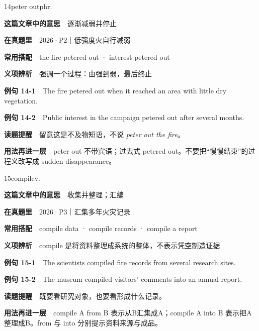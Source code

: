 \documentclass[a4paper,11pt,openany]{report}
\newcommand{\emphasislabel}[1]{\textcolor{leaf}{\CJKsf\bfseries #1}}
\begin{document}
\begin{vocabbox}{14}{peter out}{phr.}

\textbf{这篇文章中的意思}　逐渐减弱并停止

\textbf{在真题里}　2026·P2｜低强度火自行减弱

\textbf{常用搭配}　the fire petered out · interest petered out

\textbf{义项辨析}　强调一个过程：由强到弱，最后终止

\textbf{例句 14-1}　The fire petered out when it reached an area with little dry vegetation.

\textbf{例句 14-2}　Public interest in the campaign petered out after several months.

\emphasislabel{读题提醒}　留意这是不及物短语，不说 \emph{peter out the fire}。

\textbf{用法再进一层}　peter out 不带宾语；过去式 petered out。不要把``慢慢结束''的过程义改写成 sudden disappearance。

\end{vocabbox}

\begin{vocabbox}{15}{compile}{v.}

\textbf{这篇文章中的意思}　收集并整理；汇编

\textbf{在真题里}　2026·P3｜汇集多年火灾记录

\textbf{常用搭配}　compile data · compile records · compile a report

\textbf{义项辨析}　compile 是将资料整理成系统的整体，不表示凭空制造证据

\textbf{例句 15-1}　The scientists compiled fire records from several research sites.

\textbf{例句 15-2}　The museum compiled visitors' comments into an annual report.

\emphasislabel{读题提醒}　既要看研究对象，也要看形成什么记录。

\textbf{用法再进一层}　compile A from B 表示从B汇集成A；compile A into B 表示把A整理成B。from 与 into 分别提示资料来源与成品。

\end{vocabbox}
\end{document}
